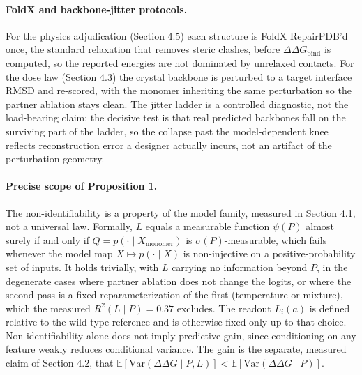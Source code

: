 \documentclass{article} %
\begin{document}
\paragraph{FoldX and backbone-jitter protocols.} For the physics adjudication (Section 4.5) each structure is
FoldX RepairPDB'd once, the standard relaxation that removes steric clashes, before $\Delta\Delta G_{\text{bind}}$
is computed, so the reported energies are not dominated by unrelaxed contacts. For the dose law (Section 4.3) the
crystal backbone is perturbed to a target interface RMSD and re-scored, with the monomer inheriting the same
perturbation so the partner ablation stays clean. The jitter ladder is a controlled diagnostic, not the
load-bearing claim: the decisive test is that real predicted backbones fall on the surviving part of the ladder, so
the collapse past the model-dependent knee reflects reconstruction error a designer actually incurs, not an
artifact of the perturbation geometry.

\paragraph{Precise scope of Proposition 1.} The non-identifiability is a property of the model family, measured in
Section 4.1, not a universal law. Formally, $L$ equals a measurable function $\psi(P)$ almost surely if and only if
$Q = p(\cdot \mid X_{\text{monomer}})$ is $\sigma(P)$-measurable, which fails whenever the model map $X \mapsto
p(\cdot \mid X)$ is non-injective on a positive-probability set of inputs. It holds trivially, with $L$ carrying no
information beyond $P$, in the degenerate cases where partner ablation does not change the logits, or where the
second pass is a fixed reparameterization of the first (temperature or mixture), which the measured $R^2(L \mid P)
= 0.37$ excludes. The readout $L_i(a)$ is defined relative to the wild-type reference and is otherwise fixed only up
to that choice. Non-identifiability alone does not imply predictive gain, since conditioning on any feature weakly
reduces conditional variance. The gain is the separate, measured claim of Section 4.2, that
$\mathbb{E}[\text{Var}(\Delta\Delta G \mid P, L)] < \mathbb{E}[\text{Var}(\Delta\Delta G \mid P)]$.
\end{document}
